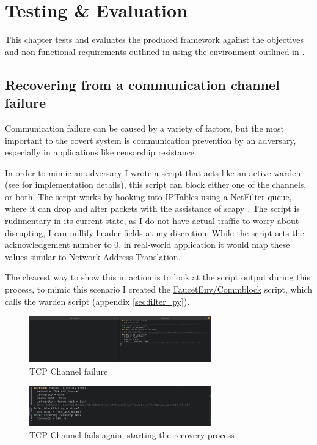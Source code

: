 \chapter{Testing \& Evaluation}

This chapter tests and evaluates the produced framework against the objectives and non-functional requirements outlined in  using the environment outlined in .

\section{Recovering from a communication channel failure}
\label{sec:failure_recovery}

Communication failure can be caused by a variety of factors, but the most important to the covert system is communication prevention by an adversary, especially in applications like censorship resistance.

In order to mimic an adversary I wrote a script that acts like an active warden (see  for implementation details), this script can block either one of the channels, or both. The script works by hooking into IPTables using a NetFilter queue, where it can drop and alter packets with the assistance of scapy \citep{scapy}. The script is rudimentary in its current state, as I do not have actual traffic to worry about disrupting, I can nullify header fields at my discretion. While the script sets the acknowledgement number to 0, in real-world application it would map these values similar to Network Address Translation.

The clearest way to show this in action is to look at the script output during this process, to mimic this scenario I created the \url{FaucetEnv/Commblock} script, which calls the warden script (appendix \ref{sec:filter_py}).

\begin{figure}[H]
    \centering
    \includegraphics[width=0.7\textwidth]{fig/TCP_Failure.png}
    \caption{TCP Channel failure}
    \label{fig:TCP_Failure}
\end{figure}

\begin{figure}[H]
    \centering
    \includegraphics[width=0.7\textwidth]{fig/TCP_Fail_into_rec.png}
    \caption{TCP Channel fails again, starting the recovery process}
    \label{fig:TCP_Failure_again}
\end{figure}

